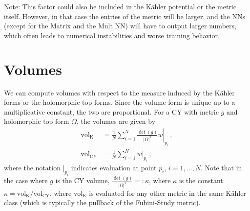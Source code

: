 \documentclass[11pt]{article}
\newcommand{\volk}{\ensuremath{\text{vol}_\text{K}}\xspace}
\newcommand{\volo}{\ensuremath{\text{vol}_\text{CY}}\xspace}
\begin{document}
\noindent Note: This factor could also be included in the K\"ahler potential or the metric itself. However, in that case the entries of the metric will be larger, and the NNs (except for the Matrix and the Mult NN) will have to output larger numbers, which often leads to numerical instabilities and worse training behavior.

\section{Volumes}
We can compute volumes with respect to the measure induced by the K\"ahler forms or the holomorphic top forms. Since the volume form is unique up to a multiplicative constant, the two are proportional. For a CY with metric $g$ and holomorphic top form $\Omega$, the volumes are given by
\begin{align*}
\volk&=\frac{1}{N}\sum_{i=1}^N \left.\frac{\det(g)}{|\Omega|^2} w\right|_{p_i}\,,\\
\volo&=\frac{1}{N}\sum_{i=1}^N w|_{p_i}\,,
\end{align*}
where the notation $|_{p_i}$ indicates evaluation at point $p_i$, $i=1,\ldots,N$. Note that in the case where $g$ is the CY volume, $\frac{\det(g)}{|\Omega|^2}=:\kappa$, where $\kappa$ is the constant $\kappa=\volk / \volo$, where $\volk$ is evaluated for any other metric in the same K\"ahler class (which is typically the pullback of the Fubini-Study metric).
\end{document}
